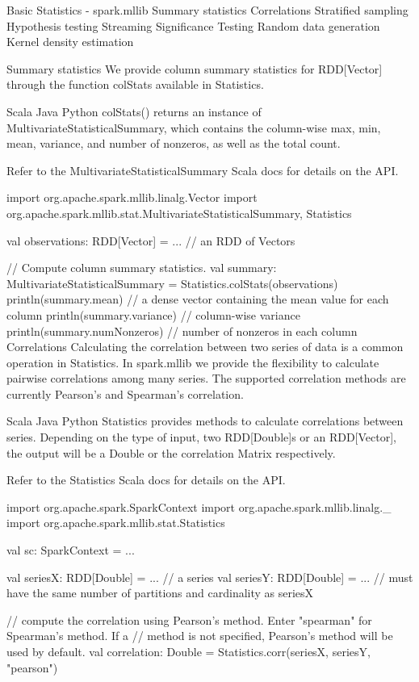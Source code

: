 Basic Statistics - spark.mllib
Summary statistics
Correlations
Stratified sampling
Hypothesis testing
Streaming Significance Testing
Random data generation
Kernel density estimation

Summary statistics
We provide column summary statistics for RDD[Vector] through the function colStats available in Statistics.

Scala
Java
Python
colStats() returns an instance of MultivariateStatisticalSummary, which contains the column-wise max, min, mean, variance, and number of nonzeros, as well as the total count.

Refer to the MultivariateStatisticalSummary Scala docs for details on the API.

import org.apache.spark.mllib.linalg.Vector
import org.apache.spark.mllib.stat.{MultivariateStatisticalSummary, Statistics}

val observations: RDD[Vector] = ... // an RDD of Vectors

// Compute column summary statistics.
val summary: MultivariateStatisticalSummary = Statistics.colStats(observations)
println(summary.mean) // a dense vector containing the mean value for each column
println(summary.variance) // column-wise variance
println(summary.numNonzeros) // number of nonzeros in each column
Correlations
Calculating the correlation between two series of data is a common operation in Statistics. In spark.mllib we provide the flexibility to calculate pairwise correlations among many series. The supported correlation methods are currently Pearson’s and Spearman’s correlation.

Scala
Java
Python
Statistics provides methods to calculate correlations between series. Depending on the type of input, two RDD[Double]s or an RDD[Vector], the output will be a Double or the correlation Matrix respectively.

Refer to the Statistics Scala docs for details on the API.

import org.apache.spark.SparkContext
import org.apache.spark.mllib.linalg._
import org.apache.spark.mllib.stat.Statistics

val sc: SparkContext = ...

val seriesX: RDD[Double] = ... // a series
val seriesY: RDD[Double] = ... // must have the same number of partitions and cardinality as seriesX

// compute the correlation using Pearson's method. Enter "spearman" for Spearman's method. If a 
// method is not specified, Pearson's method will be used by default. 
val correlation: Double = Statistics.corr(seriesX, seriesY, "pearson")

